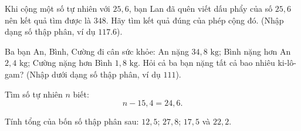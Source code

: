 \begin{ex} %
Khi cộng một số tự nhiên với $25{,}6$, bạn Lan đã quên viết dấu phẩy của số $25{,}6$ nên kết quả tìm được là $348$. Hãy tìm kết quả đúng của phép cộng đó. (Nhập dạng số thập phân, ví dụ $117.6$).
\end{ex}

\begin{ex} %
Ba bạn An, Bình, Cường đi cân sức khỏe: An nặng $34{,}8\text{ kg}$; Bình nặng hơn An $2{,}4\text{ kg}$; Cường nặng hơn Bình $1{,}8\text{ kg}$. Hỏi cả ba bạn nặng tất cả bao nhiêu ki-lô-gam? (Nhập dưới dạng số thập phân, ví dụ $111$).
\end{ex}

\begin{ex} %
Tìm số tự nhiên $n$ biết:
\[
n - 15{,}4 = 24{,}6.
\]
\end{ex}

\begin{ex} %
Tính tổng của bốn số thập phân sau: $12{,}5$; $27{,}8$; $17{,}5$ và $22{,}2$.
\end{ex}
